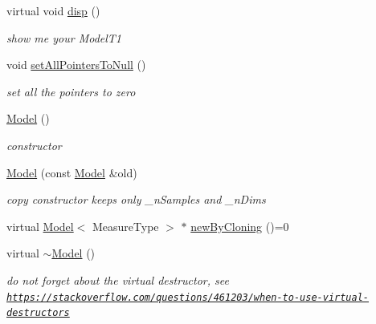 \begin{DoxyCompactItemize}
\item 
virtual void \hyperlink{class_ox_1_1_model_ae2c46e9820947efd450a93aaf53a0db5}{disp} ()\hypertarget{class_ox_1_1_model_ae2c46e9820947efd450a93aaf53a0db5}{}\label{class_ox_1_1_model_ae2c46e9820947efd450a93aaf53a0db5}

\begin{DoxyCompactList}\small\item\em show me your Model\+T1 \end{DoxyCompactList}\item 
void \hyperlink{class_ox_1_1_model_a8186fd758a6f94d9e3af204b6c1aac3c}{set\+All\+Pointers\+To\+Null} ()\hypertarget{class_ox_1_1_model_a8186fd758a6f94d9e3af204b6c1aac3c}{}\label{class_ox_1_1_model_a8186fd758a6f94d9e3af204b6c1aac3c}

\begin{DoxyCompactList}\small\item\em set all the pointers to zero \end{DoxyCompactList}\item 
\hyperlink{class_ox_1_1_model_a73f93cd40d0eddc1d3ff474fc2505fc2}{Model} ()\hypertarget{class_ox_1_1_model_a73f93cd40d0eddc1d3ff474fc2505fc2}{}\label{class_ox_1_1_model_a73f93cd40d0eddc1d3ff474fc2505fc2}

\begin{DoxyCompactList}\small\item\em constructor \end{DoxyCompactList}\item 
\hyperlink{class_ox_1_1_model_a01911912db830e4814645a675990a906}{Model} (const \hyperlink{class_ox_1_1_model}{Model} \&old)
\begin{DoxyCompactList}\small\item\em copy constructor keeps only \+\_\+n\+Samples and \+\_\+n\+Dims \end{DoxyCompactList}\item 
virtual \hyperlink{class_ox_1_1_model}{Model}$<$ Measure\+Type $>$ $\ast$ \hyperlink{class_ox_1_1_model_a694868476dd17a4d203f4ebc57047d2f}{new\+By\+Cloning} ()=0
\item 
virtual \hyperlink{class_ox_1_1_model_a6353ac7352cdbbed2d00d9ed9e697c88}{$\sim$\+Model} ()\hypertarget{class_ox_1_1_model_a6353ac7352cdbbed2d00d9ed9e697c88}{}\label{class_ox_1_1_model_a6353ac7352cdbbed2d00d9ed9e697c88}

\begin{DoxyCompactList}\small\item\em do not forget about the virtual destructor, see \href{https://stackoverflow.com/questions/461203/when-to-use-virtual-destructors}{\tt https\+://stackoverflow.\+com/questions/461203/when-\/to-\/use-\/virtual-\/destructors} \end{DoxyCompactList}\end{DoxyCompactItemize}
